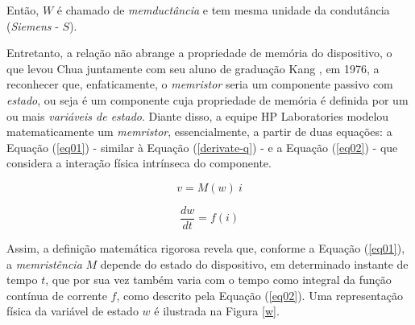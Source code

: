\documentclass{ceel}
\begin{document}
\begin{multicols}{2}
Então, $W$ é chamado de \textit{memductância} e tem mesma unidade da condutância (\textit{Siemens} - $S$).

Entretanto, a relação não abrange a propriedade de memória do dispositivo, o que levou Chua juntamente com seu aluno de graduação Kang \cite{1976}, em 1976, a reconhecer que, enfaticamente, o \emph{memristor} seria um componente passivo com \emph{estado}, ou seja é um componente cuja propriedade de memória é definida por um ou mais \emph{variáveis de estado}.
Diante disso, a equipe HP Laboratories modelou matematicamente um \emph{memristor}, essencialmente, a partir de duas equações: a Equação (\ref{eq01}) - similar à Equação (\ref{derivate-q}) - e a Equação (\ref{eq02}) - que considera a interação física intrínseca do componente.

\begin{equation}\label{eq01}
v=M( w) \ i
\end{equation}

\begin{equation}\label{eq02}
\dfrac{dw}{dt} =f(i) 
\end{equation}

Assim, a definição matemática rigorosa revela que, conforme a Equação (\ref{eq01}), a \emph{memristência} $M$ depende do estado do dispositivo, em determinado instante de tempo $t$, que por sua vez também varia com o tempo como integral da função contínua de corrente $f$, como descrito pela Equação (\ref{eq02}).  Uma representação física da variável de estado $w$ é ilustrada na Figura \ref{w}. 


\begin{figure}[H]
\centering


\end{figure}
\end{multicols}
\end{document}
